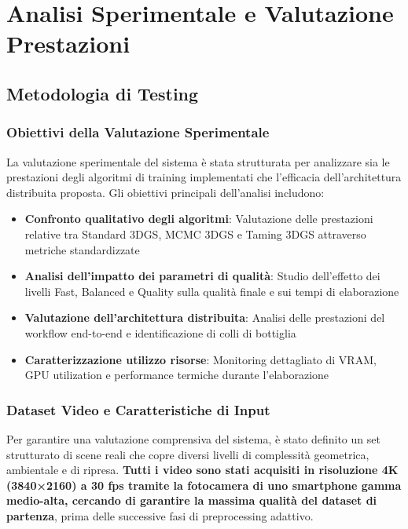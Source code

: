 \chapter{Analisi Sperimentale e Valutazione Prestazioni}
\label{chap:analisi_sperimentale}

\section{Metodologia di Testing}
\label{sec:metodologia_testing}

\subsection{Obiettivi della Valutazione Sperimentale}
\label{subsec:obiettivi_valutazione}

La valutazione sperimentale del sistema è stata strutturata per analizzare sia le prestazioni degli algoritmi di training implementati che l'efficacia dell'architettura distribuita proposta. Gli obiettivi principali dell'analisi includono:

\begin{itemize}
	\item \textbf{Confronto qualitativo degli algoritmi}: Valutazione delle prestazioni relative tra Standard 3DGS, MCMC 3DGS e Taming 3DGS attraverso metriche standardizzate
	\item \textbf{Analisi dell'impatto dei parametri di qualità}: Studio dell'effetto dei livelli Fast, Balanced e Quality sulla qualità finale e sui tempi di elaborazione
	\item \textbf{Valutazione dell'architettura distribuita}: Analisi delle prestazioni del workflow end-to-end e identificazione di colli di bottiglia
	\item \textbf{Caratterizzazione utilizzo risorse}: Monitoring dettagliato di VRAM, GPU utilization e performance termiche durante l'elaborazione
\end{itemize}

\subsection{Dataset Video e Caratteristiche di Input}
\label{subsec:dataset_video_input}

Per garantire una valutazione comprensiva del sistema, è stato definito un set strutturato di scene reali che copre diversi livelli di complessità geometrica, ambientale e di ripresa. \textbf{Tutti i video sono stati acquisiti in risoluzione 4K (3840×2160) a 30 fps tramite la fotocamera di uno smartphone gamma medio-alta, cercando di garantire la massima qualità del dataset di partenza}, prima delle successive fasi di preprocessing adattivo.

